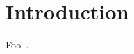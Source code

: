 \chapter{Introduction}
\label{ch:intro}

\begin{refsection}

Foo~\cite{jupyter}.

\printbibliography[heading=subbibliography]

\end{refsection}
